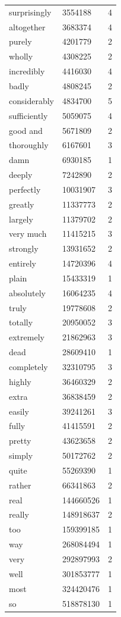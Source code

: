 \begin{table}[hbt]
\begin{center}
\begin{tabular}{llc}
    surprisingly & 3554188 & 4 \\ 
    altogether & 3683374 & 4 \\ 
    purely & 4201779 & 2 \\ 
    wholly & 4308225 & 2 \\ 
    incredibly & 4416030 & 4 \\ 
    badly & 4808245 & 2 \\ 
    considerably & 4834700 & 5 \\ 
    sufficiently & 5059075 & 4 \\ 
    good and & 5671809 & 2 \\ 
    thoroughly & 6167601 & 3 \\ 
    damn & 6930185 & 1 \\ 
    deeply & 7242890 & 2 \\ 
    perfectly & 10031907 & 3 \\ 
    greatly & 11337773 & 2 \\ 
    largely & 11379702 & 2 \\ 
    very much & 11415215 & 3 \\ 
    strongly & 13931652 & 2 \\ 
    entirely & 14720396 & 4 \\ 
    plain & 15433319 & 1 \\ 
    absolutely & 16064235 & 4 \\ 
    truly & 19778608 & 2 \\ 
    totally & 20950052 & 3 \\ 
    extremely & 21862963 & 3 \\ 
    dead & 28609410 & 1 \\ 
    completely & 32310795 & 3 \\ 
    highly & 36460329 & 2 \\ 
    extra & 36838459 & 2 \\ 
    easily & 39241261 & 3 \\ 
    fully & 41415591 & 2 \\ 
    pretty & 43623658 & 2 \\ 
    simply & 50172762 & 2 \\ 
    quite & 55269390 & 1 \\ 
    rather & 66341863 & 2 \\ 
    real & 144660526 & 1 \\ 
    really & 148918637 & 2 \\ 
    too & 159399185 & 1 \\ 
    way & 268084494 & 1 \\ 
    very & 292897993 & 2 \\ 
    well & 301853777 & 1 \\ 
    most & 324420476 & 1 \\ 
    so & 518878130 & 1
  \end{tabular}
 \end{center}
\end{table}



